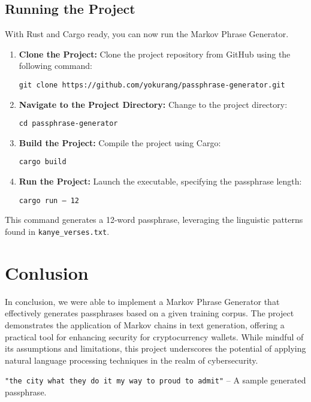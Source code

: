 \documentclass[a4paper,12pt]{article}
\begin{document}
\subsection{Running the Project}

With Rust and Cargo ready, you can now run the Markov Phrase Generator.

\begin{enumerate}
    \item \textbf{Clone the Project:}
    Clone the project repository from GitHub using the following command:

    \texttt{git clone https://github.com/yokurang/passphrase-generator.git}

    \item \textbf{Navigate to the Project Directory:}
    Change to the project directory:

    \texttt{cd passphrase-generator}

    \item \textbf{Build the Project:}
    Compile the project using Cargo:
    
    \texttt{cargo build}

    \item \textbf{Run the Project:}
    Launch the executable, specifying the passphrase length:
    
    \texttt{cargo run -- 12}

\end{enumerate}

This command generates a 12-word passphrase, leveraging the linguistic patterns found in \texttt{kanye\_verses.txt}.


\section{Conlusion}

In conclusion, we were able to implement a Markov Phrase Generator that effectively generates passphrases based on a given training corpus. The project demonstrates the application of Markov chains in text generation, offering a practical tool for enhancing security for cryptocurrency wallets. While mindful of its assumptions and limitations, this project underscores the potential of applying natural language processing techniques in the realm of cybersecurity.

\texttt{"the city what they do it my way to proud to admit"} -- A sample generated passphrase.
\end{document}
